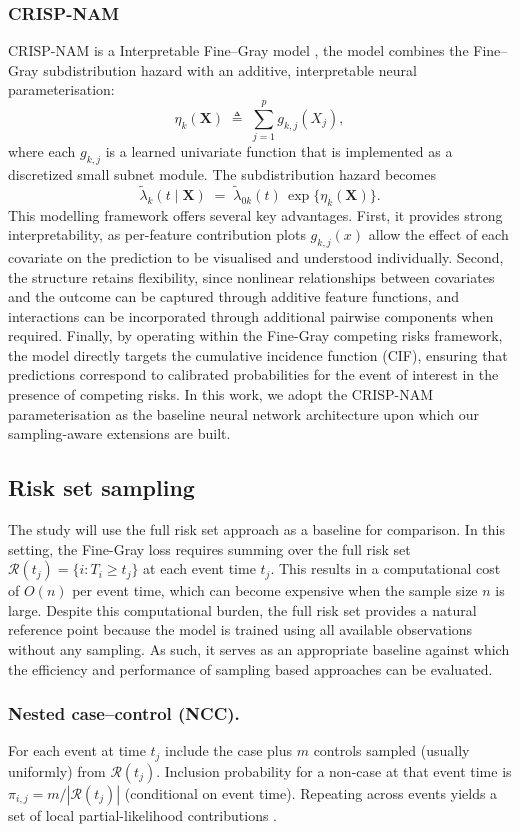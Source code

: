 \documentclass[a4paper,twoside,12pt]{report}
\begin{document}
\subsubsection{CRISP-NAM}  
CRISP-NAM is a Interpretable Fine–Gray model \citep{InterpretableFineGray2025}, the model combines the Fine–Gray subdistribution hazard with an additive, interpretable neural parameterisation:
\[
\eta_k(\boldsymbol{X}) \;\triangleq\; \sum_{j=1}^p g_{k,j}(X_j),
\]
where each \(g_{k,j}\) is a learned univariate function that is implemented as a discretized small subnet module. The subdistribution hazard becomes
\[
\tilde\lambda_k(t\mid \boldsymbol{X}) \;=\; \tilde\lambda_{0k}(t)\,\exp\{\eta_k(\boldsymbol{X})\}.
\]
This modelling framework offers several key advantages. First, it provides strong interpretability, as per-feature contribution plots $g_{k,j}(x)$ allow the effect of each covariate on the prediction to be visualised and understood individually. Second, the structure retains flexibility, since nonlinear relationships between covariates and the outcome can be captured through additive feature functions, and interactions can be incorporated through additional pairwise components when required. Finally, by operating within the Fine-Gray competing risks framework, the model directly targets the cumulative incidence function (CIF), ensuring that predictions correspond to calibrated probabilities for the event of interest in the presence of competing risks. In this work, we adopt the CRISP-NAM parameterisation as the baseline neural network architecture upon which our sampling-aware extensions are built.

\subsection{Risk set sampling}

The study will use the full risk set approach as a baseline for comparison. In this setting, the Fine-Gray loss requires summing over the full risk set $\mathcal{R}(t_j)=\{i : T_i \ge t_j\}$ at each event time $t_j$. This results in a computational cost of $O(n)$ per event time, which can become expensive when the sample size $n$ is large. Despite this computational burden, the full risk set provides a natural reference point because the model is trained using all available observations without any sampling. As such, it serves as an appropriate baseline against which the efficiency and performance of sampling based approaches can be evaluated.

\subsubsection{Nested case–control (NCC).} For each event at time \(t_j\) include the case plus \(m\) controls sampled (usually uniformly) from \(\mathcal{R}(t_j)\). Inclusion probability for a non-case at that event time is \(\pi_{i,j}=m/|\mathcal{R}(t_j)|\) (conditional on event time). Repeating across events yields a set of local partial-likelihood contributions \citep{Breslow1974,Cox1972}.
\end{document}
